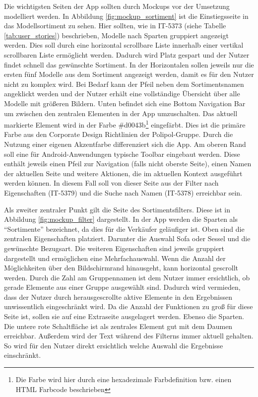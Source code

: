 Die wichtigsten Seiten der App sollten durch Mockups vor der Umsetzung modelliert werden. In Abbildung \ref{fig:mockup_sortiment} ist die Einstiegsseite in das Modellsortiment zu sehen. Hier sollten, wie in IT-5373 (siehe Tabelle \ref{tab:user_stories}) beschrieben, Modelle nach Sparten gruppiert angezeigt werden. Dies soll durch eine horizontal scrollbare Liste innerhalb einer vertikal scrollbaren Liste ermöglicht werden. Dadurch wird Platz gespart und der Nutzer findet schnell das gewünschte Sortiment. In der Horizontalen sollen jeweils nur die ersten fünf Modelle aus dem Sortiment angezeigt werden, damit es für den Nutzer nicht zu komplex wird. Bei Bedarf kann der Pfeil neben dem Sortimentsnamen angeklickt werden und der Nutzer erhält eine vollständige Übersicht über alle Modelle mit größeren Bildern. Unten befindet sich eine Bottom Navigation Bar um zwischen den zentralen Elementen in der App umzuschalten. Das aktuell markierte Element wird in der Farbe \#d0043b\footnote{Die Farbe wird hier durch eine hexadezimale Farbdefinition bzw. einen \gls{HTML} Farbcode beschrieben} eingefärbt. Dies ist die primäre Farbe aus den Corporate Design Richtlinien der Polipol-Gruppe. Durch die Nutzung einer eigenen Akzentfarbe differenziert sich die App. Am oberen Rand soll eine für Android-Anwendungen typische Toolbar eingebaut werden. Diese enthält jeweils einen Pfeil zur Navigation (falls nicht oberste Seite), einen Namen der aktuellen Seite und weitere Aktionen, die im aktuellen Kontext ausgeführt werden können. In diesem Fall soll von dieser Seite aus der Filter nach Eigenschaften (IT-5379) und die Suche nach Namen (IT-5378) erreichbar sein.

Als zweiter zentraler Punkt gilt die Seite des Sortimentsfilters. Diese ist in Abbildung \ref{fig:mockup_filter} dargestellt. In der App werden die Sparten als \enquote{Sortimente} bezeichnet, da dies für die Verkäufer geläufiger ist. Oben sind die zentralen Eigenschaften platziert. Darunter die Auswahl Sofa oder Sessel und die gewünschte Bezugsart. Die weiteren Eigenschaften sind jeweils gruppiert dargestellt und ermöglichen eine Mehrfachauswahl. Wenn die Anzahl der Möglichkeiten über den Bildschirmrand hinausgeht, kann horizontal gescrollt werden. Durch die Zahl am Gruppennamen ist dem Nutzer immer ersichtlich, ob gerade Elemente aus einer Gruppe ausgewählt sind. Dadurch wird vermieden, dass der Nutzer durch herausgescrollte aktive Elemente in den Ergebnissen unwissentlich eingeschränkt wird. Da die Anzahl der Funktionen zu groß für diese Seite ist, sollen sie auf eine Extraseite ausgelagert werden. Ebenso die Sparten. Die untere rote Schaltfläche ist als zentrales Element gut mit dem Daumen erreichbar. Außerdem wird der Text während des Filterns immer aktuell gehalten. So wird für den Nutzer direkt ersichtlich welche Auswahl die Ergebnisse einschränkt.

